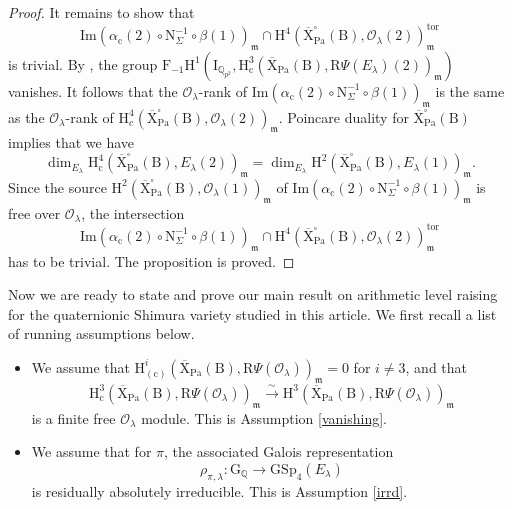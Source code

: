 \documentclass[10pt]{amsart}
\numberwithin{equation}{section}
\theoremstyle{definition}
\def\GSp{\mathrm{GSp}}
\def\Pa{\mathrm{Pa}}
\def\calO{\mathcal{O}}
\def\fracm{\mathfrak{m}}
\def\QQ{\mathbb{Q}}
\def\rmc{\mathrm{c}}
\def\rmB{\mathrm{B}}
\def\rmG{\mathrm{G}}
\def\rmH{\mathrm{H}}
\def\rmN{\mathrm{N}}
\def\rmR{\mathrm{R}}
\def\rmX{\mathrm{X}}
\begin{document}
\begin{proof}
It remains to show that 
\begin{equation*}
\mathrm{Im}(\alpha_{\rmc}(2)\circ \rmN^{-1}_{\Sigma}\circ \beta(1))_{\fracm} \cap \rmH^{4}(\overline{\rmX}^{\square}_{\Pa}(\rmB), \calO_{\lambda}(2))^{\mathrm{tor}}_{\fracm} 
\end{equation*}
is trivial. By \cite[Proposition 4.2.2(1)]{Nekovar}, the group $\mathrm{F}_{-1}\mathrm{H}^{1}(\mathrm{I}_{\QQ_{p^{2}}}, \rmH^{3}_{\rmc}(\overline{\rmX}_{\Pa}(\rmB), \rmR\Psi(E_{\lambda})(2))_{\fracm})$ vanishes. It follows that the $\calO_{\lambda}$-rank of $\mathrm{Im}(\alpha_{\rmc}(2)\circ \rmN^{-1}_{\Sigma}\circ \beta(1))_{\fracm}$ is the same as the $\calO_{\lambda}$-rank of $\rmH^{4}_{c}(\overline{\rmX}^{\square}_{\Pa}(\rmB), \calO_{\lambda}(2))_{\fracm}$. Poincare duality for $\overline{\rmX}^{\square}_{\Pa}(\rmB)$ implies that we have 
\begin{equation*}
\dim_{E_{\lambda}} \rmH^{4}_{\rmc}(\overline{\rmX}^{\square}_{\Pa}(\rmB), E_{\lambda}(2))_{\fracm}=\dim_{E_{\lambda}}  \rmH^{2}(\overline{\rmX}^{\square}_{\Pa}(\rmB), E_{\lambda}(1))_{\fracm}.
\end{equation*} 
Since the source $\rmH^{2}(\overline{\rmX}^{\square}_{\Pa}(\rmB), \calO_{\lambda}(1))_{\fracm}$ of $\mathrm{Im}(\alpha_{\rmc}(2)\circ \rmN^{-1}_{\Sigma}\circ \beta(1))_{\fracm}$  is free over $\calO_{\lambda}$, the intersection  
\begin{equation*}
\mathrm{Im}(\alpha_{\rmc}(2)\circ \rmN^{-1}_{\Sigma}\circ \beta(1))_{\fracm} \cap \rmH^{4}(\overline{\rmX}^{\square}_{\Pa}(\rmB), \calO_{\lambda}(2))^{\mathrm{tor}}_{\fracm}
\end{equation*}
has to be trivial. The proposition is proved. 
\end{proof}
Now we are ready to state and prove our main result on arithmetic level raising for the quaternionic Shimura variety studied in this article. We first recall a list of running assumptions below.
\begin{itemize}
\item We assume that $\rmH^{i}_{(\rmc)}(\overline{\rmX}_{\Pa}(\rmB), \rmR\Psi(\calO_{\lambda}))_{\fracm}=0$ for $i\neq 3$, and that 
\begin{equation*}
\rmH^{3}_{\rmc}(\overline{\rmX}_{\Pa}(\rmB), \rmR\Psi(\calO_{\lambda}))_{\fracm}\xrightarrow{\sim} \rmH^{3}(\overline{\rmX}_{\Pa}(\rmB), \rmR\Psi(\calO_{\lambda}))_{\fracm}
\end{equation*}
is a finite free $\calO_{\lambda}$ module. This is Assumption \ref{vanishing}.
\item We assume that for $\pi$, the associated Galois representation 
\begin{equation*}
\rho_{\pi, \lambda}:\rmG_{\QQ}\rightarrow \GSp_{4}(E_{\lambda})
\end{equation*}
is residually absolutely irreducible. This is Assumption \ref{irrd}.
\end{itemize}
\end{document}
